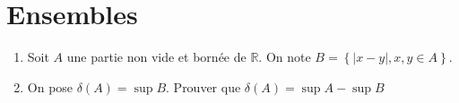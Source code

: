 \documentclass{article}
\begin{document}
\section{Ensembles}%
\label{sec:Ensembles}

\begin{exercise}
    
    \begin{enumerate}
        \item Soit $A$ une partie non vide et bornée de $\mathbb{R}$. On note $B=\left\{ \lvert x-y \lvert ,x,y \in A \right\} $.
        \item On pose $\delta(A) = \sup B$. Prouver que $\delta(A) = \sup A - \sup B$ 
    \end{enumerate}
\end{exercise}
\end{document}
